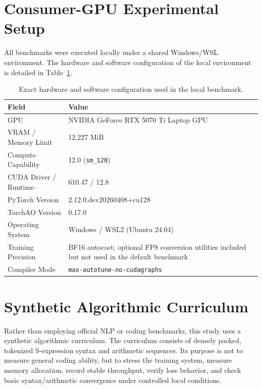 \documentclass[11pt,a4paper]{article}
\begin{document}
\section{Consumer-GPU Experimental Setup}
All benchmarks were executed locally under a shared Windows/WSL environment. The hardware and software configuration of the local environment is detailed in Table~\ref{tab:env}.

\begin{table}[h]
\centering
\begin{tabular}{lp{}}
\toprule
\textbf{Field} & \textbf{Value} \\
\midrule
GPU & NVIDIA GeForce RTX 5070 Ti Laptop GPU \\
VRAM / Memory Limit & 12,227 MiB \\
Compute Capability & 12.0 (\texttt{sm\_120}) \\
CUDA Driver / Runtime & 610.47 / 12.8 \\
PyTorch Version & 2.12.0.dev20260408+cu128 \\
TorchAO Version & 0.17.0 \\
Operating System & Windows / WSL2 (Ubuntu 24.04) \\
Training Precision & BF16 autocast; optional FP8 conversion utilities included but not used in the default benchmark \\
Compiler Mode & \texttt{max-autotune-no-cudagraphs} \\
\bottomrule
\end{tabular}
\caption{Exact hardware and software configuration used in the local benchmark.}
\label{tab:env}
\end{table}

\section{Synthetic Algorithmic Curriculum}
Rather than employing official NLP or coding benchmarks, this study uses a synthetic algorithmic curriculum. The curriculum consists of densely packed, tokenized S-expression syntax and arithmetic sequences. Its purpose is not to measure general coding ability, but to stress the training system, measure memory allocation, record stable throughput, verify loss behavior, and check basic syntax/arithmetic convergence under controlled local conditions.
\end{document}
